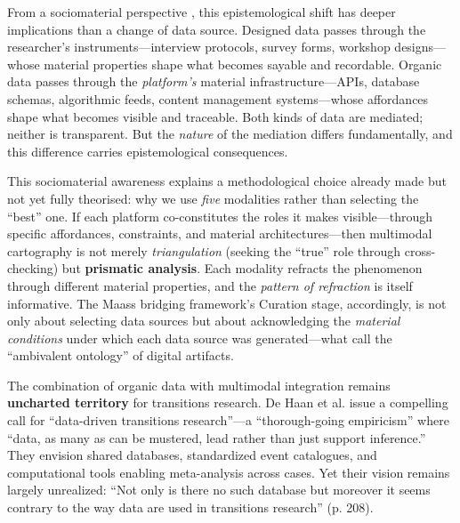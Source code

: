 \documentclass[../main.tex]{subfiles}
\begin{document}
From a sociomaterial perspective \cite{orlikowski2008sociomateriality}, this epistemological shift has deeper implications than a change of data source. Designed data passes through the researcher's instruments---interview protocols, survey forms, workshop designs---whose material properties shape what becomes sayable and recordable. Organic data passes through the \emph{platform's} material infrastructure---APIs, database schemas, algorithmic feeds, content management systems---whose affordances shape what becomes visible and traceable. Both kinds of data are mediated; neither is transparent. But the \emph{nature} of the mediation differs fundamentally, and this difference carries epistemological consequences.

This sociomaterial awareness explains a methodological choice already made but not yet fully theorised: why we use \emph{five} modalities rather than selecting the ``best'' one. If each platform co-constitutes the roles it makes visible---through specific affordances, constraints, and material architectures---then multimodal cartography is not merely \emph{triangulation} (seeking the ``true'' role through cross-checking) but \textbf{prismatic analysis}. Each modality refracts the phenomenon through different material properties, and the \emph{pattern of refraction} is itself informative. The Maass bridging framework's Curation stage, accordingly, is not only about selecting data sources but about acknowledging the \emph{material conditions} under which each data source was generated---what \textcite{kallinikos2013ambivalent} call the ``ambivalent ontology'' of digital artifacts.

The combination of organic data with multimodal integration remains \textbf{uncharted territory} for transitions research. De Haan et al. \citeyear{dehaan2019datadriven} issue a compelling call for ``data-driven transitions research''---a ``thorough-going empiricism'' where ``data, as many as can be mustered, lead rather than just support inference.'' They envision shared databases, standardized event catalogues, and computational tools enabling meta-analysis across cases. Yet their vision remains largely unrealized: ``Not only is there no such database but moreover it seems contrary to the way data are used in transitions research'' (p. 208).
\end{document}
